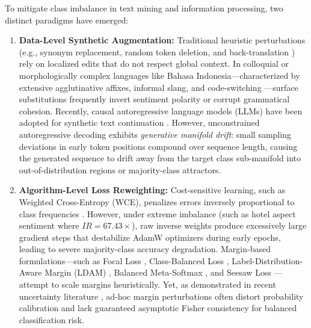 \documentclass[final,5p,times,twocolumn]{elsarticle}
\begin{document}
To mitigate class imbalance in text mining and information processing, two distinct paradigms have emerged:
\begin{enumerate}
    \item \textbf{Data-Level Synthetic Augmentation:} Traditional heuristic perturbations (e.g., synonym replacement, random token deletion, and back-translation \cite{chawla2002smote, wei2019eda, shorten2021text}) rely on localized edits that do not respect global context. In colloquial or morphologically complex languages like Bahasa Indonesia—characterized by extensive agglutinative affixes, informal slang, and code-switching \cite{salsabila2018colloquial}—surface substitutions frequently invert sentiment polarity or corrupt grammatical cohesion. Recently, causal autoregressive language models (LLMs) have been adopted for synthetic text continuation \cite{kumar2020data, refai2023data, dai2023augmenting, ding2024gpt4}. However, unconstrained autoregressive decoding exhibits \textit{generative manifold drift}: small sampling deviations in early token positions compound over sequence length, causing the generated sequence to drift away from the target class sub-manifold into out-of-distribution regions or majority-class attractors.
    \item \textbf{Algorithm-Level Loss Reweighting:} Cost-sensitive learning, such as Weighted Cross-Entropy (WCE), penalizes errors inversely proportional to class frequencies \cite{zhang2023deep, alshammari2022long}. However, under extreme imbalance (such as hotel aspect sentiment where $IR = 67.43\times$), raw inverse weights produce excessively large gradient steps that destabilize AdamW optimizers during early epochs, leading to severe majority-class accuracy degradation. Margin-based formulations—such as Focal Loss \cite{lin2017focal}, Class-Balanced Loss \cite{cui2019class}, Label-Distribution-Aware Margin (LDAM) \cite{cao2019learning}, Balanced Meta-Softmax \cite{ren2020balanced}, and Seesaw Loss \cite{wang2021seesaw}—attempt to scale margins heuristically. Yet, as demonstrated in recent uncertainty literature \cite{guo2017calibration, minderer2021revisiting, wang2023margin}, ad-hoc margin perturbations often distort probability calibration and lack guaranteed asymptotic Fisher consistency for balanced classification risk.
\end{enumerate}
\end{document}
